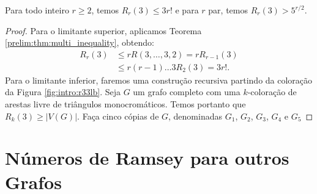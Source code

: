 \begin{proposition}
\label{prelim:thm:multi3ub} Para todo inteiro $r \geq 2$, temos
$R_r(3) \leq 3 r!$ e para $r$ par, temos $R_r(3) > 5^{r/2}$.
\end{proposition}
\begin{proof}
Para o limitante superior, aplicamos Teorema \ref{prelim:thm:multi_inequality}, obtendo:
\begin{align*}
R_{r}(3) &\leq rR(3,\dots,3,2) = rR_{r-1}(3) \\
&\leq r(r-1)\dots3 R_2(3) = 3r!.
\end{align*}
Para o limitante inferior, faremos uma construção recursiva partindo da coloração da Figura \ref{fig:intro:r33lb}. Seja $G$ um grafo completo com uma $k$-coloração de arestas livre de triângulos monocromáticos. Temos portanto que $R_k(3) \geq |V(G)|$. Faça cinco cópias de $G$, denominadas $G_1$, $G_2$, $G_3$, $G_4$ e $G_5$
\end{proof}




\section{Números de Ramsey para outros Grafos}




